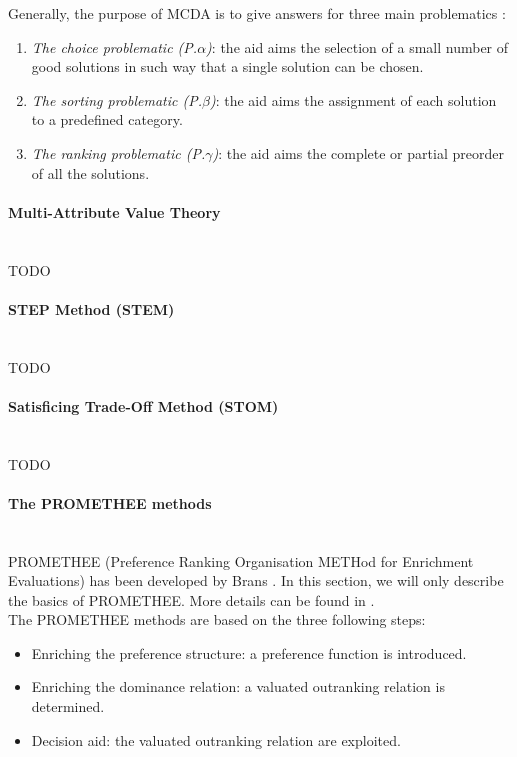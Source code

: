 Generally, the purpose of MCDA is to give answers for three main problematics \cite{EhrgottFigueiraGreco2005}:
\begin{enumerate}
\item \textit{The choice problematic (P.$\alpha$)}: the aid aims the selection of a small number of good solutions in such way that a single solution can be chosen.
\item \textit{The sorting problematic (P.$\beta$)}: the aid aims the assignment of each solution to a predefined category.
\item \textit{The ranking problematic (P.$\gamma$)}: the aid aims the complete or partial preorder of all the solutions.
\end{enumerate}

\paragraph{Multi-Attribute Value Theory}~\\
TODO

\paragraph{STEP Method (STEM)}~\\
TODO

\paragraph{Satisficing Trade-Off Method (STOM)}~\\
TODO

\paragraph{The PROMETHEE methods}~\\
PROMETHEE (Preference Ranking Organisation METHod for Enrichment Evaluations) has been developed by Brans \cite{Brans1}. In this section, we will only describe the basics of PROMETHEE. More details can be found in \cite{Beh2010}.\\
The PROMETHEE methods are based on the three following steps:
\begin{itemize}
\item Enriching the preference structure: a preference function is introduced.
\item Enriching the dominance relation: a valuated outranking relation is determined.
\item Decision aid: the valuated outranking relation are exploited.
\end{itemize}

